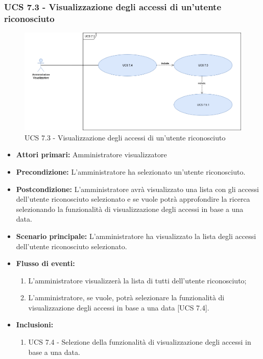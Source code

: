 \subsubsection{UCS 7.3 - Visualizzazione degli accessi di un'utente riconosciuto}
\begin{figure}[h]
	\centering
	\includegraphics[scale=0.3]{sezioni/UseCase/Immagini/UCS7_1.png}
	\caption{UCS 7.3 - Visualizzazione degli accessi di un'utente riconosciuto}
\end{figure}
\begin{itemize}
	\item \textbf{Attori primari:} Amministratore visualizzatore
	\item \textbf{Precondizione:} L'amministratore ha selezionato un'utente riconosciuto.
	\item \textbf{Postcondizione:} L'amministratore avrà visualizzato una lista con gli accessi dell'utente riconosciuto selezionato e se vuole potrà approfondire la ricerca selezionando la funzionalità di visualizzazione degli accessi in base a una data.
	\item \textbf{Scenario principale:} L'amministratore ha visualizzato la lista degli accessi dell'utente riconosciuto selezionato.
	\item \textbf{Flusso di eventi:} 
	\begin{enumerate}
		\item L'amministratore visualizzerà la lista di tutti dell'utente riconosciuto;
		\item L'amministratore, se vuole, potrà selezionare la funzionalità di visualizzazione degli accessi in base a una data [UCS 7.4].
	\end{enumerate}
	\item \textbf{Inclusioni:}
	\begin{enumerate}
		\item UCS 7.4 - Selezione della funzionalità di visualizzazione degli accessi in base a una data.
	\end{enumerate}
\end{itemize}





